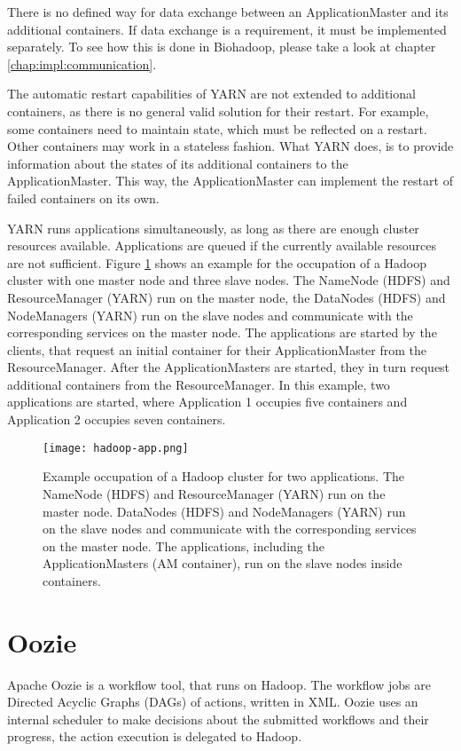 There is no defined way for data exchange between an ApplicationMaster and its additional containers. If data exchange is a requirement, it must be implemented separately. To see how this is done in Biohadoop, please take a look at chapter \ref{chap:impl:communication}.

The automatic restart capabilities of YARN are not extended to additional containers, as there is no general valid solution for their restart. For example, some containers need to maintain state, which must be reflected on a restart. Other containers may work in a stateless fashion. What YARN does, is to provide information about the states of its additional containers to the ApplicationMaster. This way, the ApplicationMaster can implement the restart of failed containers on its own.

YARN runs applications simultaneously, as long as there are enough cluster resources available. Applications are queued if the currently available resources are not sufficient. Figure \ref{fig:hadoop-app} shows an example for the occupation of a Hadoop cluster with one master node and three slave nodes. The NameNode (HDFS) and ResourceManager (YARN) run on the master node, the DataNodes (HDFS) and NodeManagers (YARN) run on the slave nodes and communicate with the corresponding services on the master node. The applications are started by the clients, that request an initial container for their ApplicationMaster from the ResourceManager. After the ApplicationMasters are started, they in turn request additional containers from the ResourceManager. In this example, two applications are started, where Application 1 occupies five containers and Application 2 occupies seven containers.

\begin{figure}[ht!]
  \centering
  \texttt{[image: hadoop-app.png]}
  \caption{Example occupation of a Hadoop cluster for two applications. The NameNode (HDFS) and ResourceManager (YARN) run on the master node. DataNodes (HDFS) and NodeManagers (YARN) run on the slave nodes and communicate with the corresponding services on the master node. The applications, including the ApplicationMasters (AM container), run on the slave nodes inside containers.}
  \label{fig:hadoop-app}
\end{figure}

\section{Oozie}
\label{chap:hadoop:oozie}
Apache Oozie is a workflow tool, that runs on Hadoop. The workflow jobs are Directed Acyclic Graphs (DAGs) of actions, written in XML. Oozie uses an internal scheduler to make decisions about the submitted workflows and their progress, the action execution is delegated to Hadoop.


